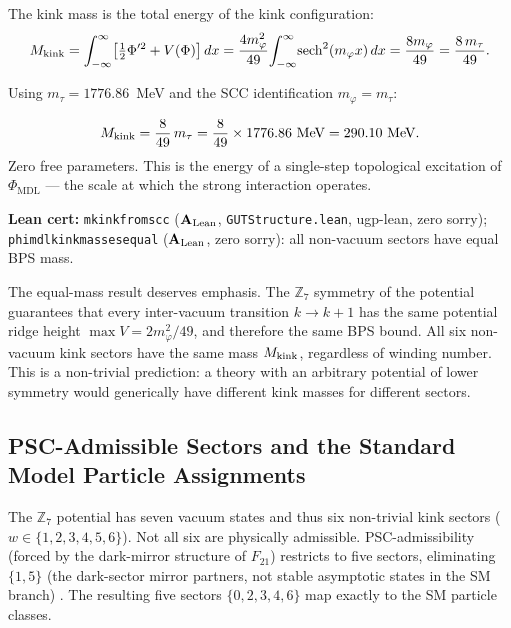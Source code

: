 \documentclass[11pt,openany]{book}
\theoremstyle{remark}
\newcommand{\PHIMDL}{\Phi_{\mathrm{MDL}}}
\newcommand{\ZS}{\mathbb{Z}_7}
\newcommand{\lean}[1]{%
  \penalty-100
  \begingroup\def\_{\textunderscore\allowbreak}\texttt{#1}\endgroup}
\newcommand{\Mkink}{M_{\rm kink}}
\newcommand{\CatAL}{\ensuremath{\textbf{A}_{\rm Lean}}}
\begin{document}
The kink mass is the total energy of the kink configuration:
\begin{equation}
\Mkink
= \int_{-\infty}^{\infty}\!\left[\tfrac{1}{2}\Phi'^2 + V(\Phi)\right]dx
= \frac{4m_\varphi^2}{49}\!\int_{-\infty}^{\infty}\!\mathrm{sech}^2(m_\varphi x)\,dx
= \frac{8m_\varphi}{49}
= \frac{8\,m_\tau}{49}.
\label{eq:kink_mass}
\end{equation}

Using $m_\tau = 1776.86$~MeV and the SCC identification $m_\varphi = m_\tau$:

\begin{tcolorbox}[colback=orange!5,colframe=orange!60,
  title={Result: BPS Kink Mass (\CatAL)}]
\[
\Mkink = \frac{8}{49}\,m_\tau = \frac{8}{49}\times 1776.86\text{ MeV} = 290.10\text{ MeV}.
\]
Zero free parameters.
This is the energy of a single-step topological excitation of $\PHIMDL$
--- the scale at which the strong interaction operates.

\smallskip\noindent
\textbf{Lean cert:} \lean{mkink\_from\_scc} (\CatAL, \texttt{GUTStructure.lean}, ugp-lean,
zero sorry);
\lean{phimdl\_kink\_masses\_equal} (\CatAL, zero sorry): all non-vacuum sectors have equal BPS mass.
\end{tcolorbox}

The equal-mass result deserves emphasis.
The $\ZS$ symmetry of the potential guarantees that every inter-vacuum transition
$k\to k{+}1$ has the same potential ridge height $\max V = 2m_\varphi^2/49$,
and therefore the same BPS bound.
All six non-vacuum kink sectors have the same mass $\Mkink$, regardless of winding number.
This is a non-trivial prediction: a theory with an arbitrary potential of lower symmetry
would generically have different kink masses for different sectors.

\subsection*{PSC-Admissible Sectors and the Standard Model Particle Assignments}

The $\ZS$ potential has seven vacuum states and thus six non-trivial kink sectors
($w \in \{1,2,3,4,5,6\}$).
Not all six are physically admissible.
PSC-admissibility (forced by the dark-mirror structure of $F_{21}$) restricts to
five sectors, eliminating $\{1,5\}$ (the dark-sector mirror partners, not stable
asymptotic states in the SM branch) \cite{SpivackPhiMDLField,SpivackCompleteness}.
The resulting five sectors $\{0,2,3,4,6\}$ map exactly to the SM particle classes.
\end{document}
